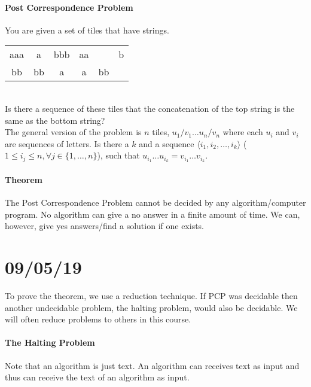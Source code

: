 \documentclass[12 pt]{article}
\begin{document}
\paragraph{Post Correspondence Problem}You are given a set of tiles
that have strings.
\\
\begin{tabular}{|c| c| c| c| c |c|}
  \hline aaa&a&bbb&aa&&b
  \\ bb & bb & a & a & bb &
  \\ \hline
\end{tabular}
\\ Is there a sequence of these tiles that the concatenation of the
top string is the same as the bottom string?
\\ The general version of the problem is $n$ tiles, $u_1/v_1 \ldots
u_n/v_n$ where each $u_i$ and $v_i$ are sequences of letters. Is there
a $k$ and a sequence $\langle i_1, i_2, \ldots, i_k \rangle$ ($1 \leq
i_j \leq n, \forall j \in \{1,\ldots,n\}$), such that $u_{i_1} \ldots
u_{i_k} = v_{i_1} \ldots v_{i_k}$.
\paragraph{Theorem} The Post Correspondence Problem cannot be decided by any
algorithm/computer program. No algorithm can give a no answer in a
finite amount of time. We can, however, give yes answers/find a
solution if one exists.
\section{09/05/19}
To prove the theorem, we use a reduction technique. If PCP was
decidable then another undecidable problem, the halting problem, would
also be decidable. We will often reduce problems to others in this
course.
\paragraph{The Halting Problem}
Note that an algorithm is just text. An algorithm can receives text as
input and thus can receive the text of an algorithm as input.
\end{document}
